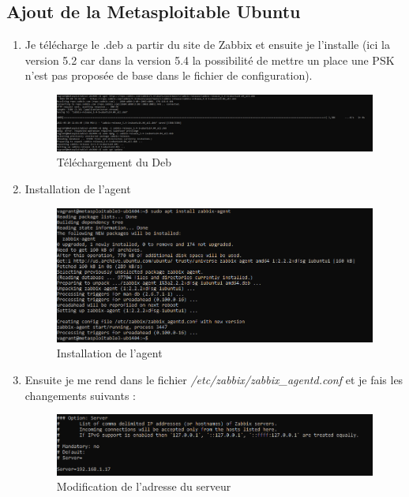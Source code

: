 \documentclass[a4paper]{article}
\begin{document}
\subsection{Ajout de la Metasploitable Ubuntu}
\begin{enumerate}
  \item Je télécharge le .deb a partir du site de Zabbix et ensuite je l'installe (ici la version 5.2 car dans la version 5.4 la possibilité de mettre un place une PSK n'est pas proposée de base dans le fichier de 
  configuration).
  \begin{figure}[H]
    \centering
    \includegraphics[width=12cm]{images/Rapport/ubuntu/zabbix/11.png}
    \caption{Téléchargement du Deb}
  \end{figure}
  \item Installation de l'agent
  \begin{figure}[H]
    \centering
    \includegraphics[width=12cm]{images/Rapport/ubuntu/zabbix/1.png}
    \caption{Installation de l'agent}
  \end{figure}
  \item Ensuite je me rend dans le fichier \emph{/etc/zabbix/zabbix\_agentd.conf} et je fais les changements suivants :
  \begin{figure}[H]
    \centering
    \includegraphics[width=12cm]{images/Rapport/ubuntu/zabbix/2.png}
    \caption{Modification de l'adresse du serveur}
  \end{figure}
  \begin{figure}[H]

\end{figure}
\end{enumerate}
\end{document}
